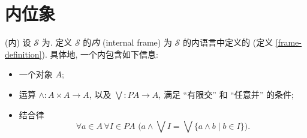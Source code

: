 



\section{内位象}

\begin{prop}
	[label={internal-frame}]
	{(内\fm{})}
	设 $\mathcal S$ 为\topos{}. 定义 $\mathcal S$ 的\emph{内\fm{}} (internal frame) 为 $\mathcal S$ 的内语言中定义的\fm{} (定义 \ref{frame-definition}). 具体地, 一个内\fm{}包含如下信息:
	\begin{itemize}
		\item 一个对象 $A$;
		\item 运算 $\land\colon A\times A\to A$, 以及 $\bigvee\colon PA\to A$, 满足 ``有限交'' 和 ``任意并'' 的条件;
		\item 结合律
		\[
		\forall a\in A\,\forall I\in PA\,\,\Big(a\land \bigvee I = \bigvee \{a\land b\mid b\in I\}\Big).
		\]
	\end{itemize}
\end{prop}















